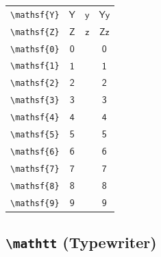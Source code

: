 \documentclass[12pt,a4paper]{article}
\begin{document}
\begin{longtable}{|c|c|c|c|}
\verb|\mathsf{Y}| & $\mathsf{Y}$ & $\mathsf{y}$ & $ 𝖸 𝗒 $ \\
\verb|\mathsf{Z}| & $\mathsf{Z}$ & $\mathsf{z}$ & $ 𝖹 𝗓 $ \\
\verb|\mathsf{0}| & $\mathsf{0}$ & & $ 𝟢 $ \\
\verb|\mathsf{1}| & $\mathsf{1}$ & & $ 𝟣 $ \\
\verb|\mathsf{2}| & $\mathsf{2}$ & & $ 𝟤 $ \\
\verb|\mathsf{3}| & $\mathsf{3}$ & & $ 𝟥 $ \\
\verb|\mathsf{4}| & $\mathsf{4}$ & & $ 𝟦 $ \\
\verb|\mathsf{5}| & $\mathsf{5}$ & & $ 𝟧 $ \\
\verb|\mathsf{6}| & $\mathsf{6}$ & & $ 𝟨 $ \\
\verb|\mathsf{7}| & $\mathsf{7}$ & & $ 𝟩 $ \\
\verb|\mathsf{8}| & $\mathsf{8}$ & & $ 𝟪 $ \\
\verb|\mathsf{9}| & $\mathsf{9}$ & & $ 𝟫 $ \\
\hline
\end{longtable}

\newpage

\subsection*{\texttt{\textbackslash{}mathtt} (Typewriter)}
\end{document}
